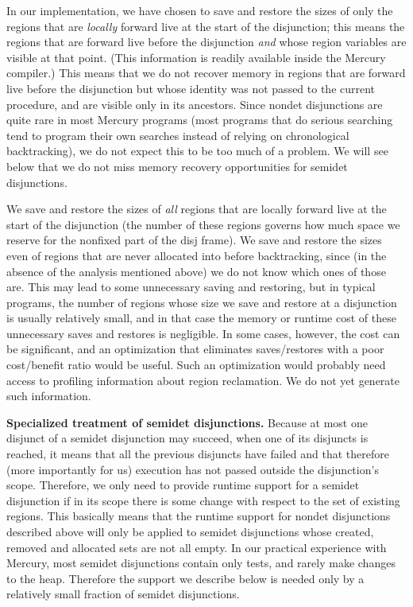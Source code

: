\documentclass{tlp}
\begin{document}
In our implementation,
we have chosen to save and restore the sizes of only the regions
that are \emph{locally} forward live at the start of the disjunction;
this means the regions that are forward live before the disjunction
\emph{and} whose region variables are visible at that point.
(This information is readily available inside the Mercury compiler.)
This means that we do not recover memory in regions
that are forward live before the disjunction
but whose identity was not passed to the current procedure,
and are visible only in its ancestors.
Since nondet disjunctions are quite rare in most Mercury programs
(most programs that do serious searching tend to program their own searches
instead of relying on chronological backtracking),
we do not expect this to be too much of a problem.
We will see below that
we do not miss memory recovery opportunities for semidet disjunctions.

We save and restore the sizes of \emph{all} regions
that are locally forward live at the start of the disjunction
(the number of these regions governs
how much space we reserve for the nonfixed part of the disj frame).
We save and restore the sizes even of regions
that are never allocated into before backtracking,
since (in the absence of the analysis mentioned above)
we do not know which ones of those are.
This may lead to some unnecessary saving and restoring,
but in typical programs,
the number of regions whose size we save and restore at a disjunction
is usually relatively small,
and in that case the memory or runtime cost
of these unnecessary saves and restores is negligible.
In some cases, however, the cost can be significant,
and an optimization that eliminates saves/restores
with a poor cost/benefit ratio would be useful.
Such an optimization would probably need access
to profiling information about region reclamation.
We do not yet generate such information.

\noindent\textbf{Specialized treatment of semidet disjunctions.}
Because at most one disjunct of a semidet disjunction may succeed,
when one of its disjuncts is reached,
it means that all the previous disjuncts have failed and
that therefore (more importantly for us)
execution has not passed outside the disjunction's scope.
Therefore, we only need to provide runtime support for a semidet disjunction
if in its scope there is some change
with respect to the set of existing regions.
This basically means that
the runtime support for nondet disjunctions described above
will only be applied to semidet disjunctions
whose created, removed and allocated sets are not all empty.
In our practical experience with Mercury,
most semidet disjunctions contain only tests,
and rarely make changes to the heap.
Therefore the support we describe below
is needed only by a relatively small fraction of semidet disjunctions.
\end{document}
